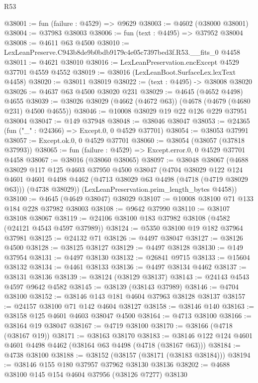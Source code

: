 \begin{lexlean}{R53}
\begin{coremodule}
@38001 := fun (failure : @4529) => @9629
@38003 := @4602 (@38000 @38001)
@38004 := @37983 @38003
@38006 := fun (text : @4495) => @37952 @38004
@38008 := @4611 @63 @4500
@38010 := LexLeanPreserve.C943b8de9b0bdb9179c4e05c7397bed3f.R53.__fits_0 @4458
@38011 := @4621 @38010
@38016 := LexLeanPreservation.encExcept @4529 @37701 @4559 @4552
@38019 := @38016 (LexLeanBoot.SurfaceLex.lexText @4458)
@38020 := @38011 @38019
@38022 := (text : @4495) -> @38008 @38020
@38026 := @4637 @63 @4500 @38020 @231
@38029 := @4645 (@4652 @4498) @4655
@38039 := @38026 @38029 (@4662 (@4672 @63)) (@4678 (@4679 (@4680 @231) @4500 @4655))
@38046 := @10008 @38029 @19 @22 @126 @229 @37951 @38004
@38047 := @149 @37948
@38048 := @38046 @38047
@38053 := @24365 (fun ("_" : @24366) => Except.{0, 0} @4529 @37701)
@38054 := @38053 @37991
@38057 := Except.ok.{0, 0} @4529 @37701
@38060 := @38054 (@38057 (@37818 @37993))
@38065 := fun (failure : @4529) => Except.error.{0, 0} @4529 @37701 @4458
@38067 := @38016 (@38060 @38065)
@38097 := @38048
    @38067
    (@4688
      @38029
      @117
      @125
      @4603
      @37950
      @4500
      @38047
      (@4704
        @38029
        @122
        @124
        @4601
        @4601
        @4498
        @4462
        (@4713 @38029 @63 @4498 (@4718 (@4719 @38029 @63)))
        (@4738 @38029))
      (LexLeanPreservation.prim_length_bytes @4458))
@38100 := @4645 (@4649 @38047) @38029
@38107 := @10008 @38100 @71 @133 @184 @228 @37982 @38003
@38108 := @9642 @37990
@38110 := @38107 @38108 @38067
@38119 := @24106 @38100 @183 @37982 @38108 (@4582 (@24121 @4543 @4597 @37989))
@38124 := @5350 @38100 @19 @182 @37964 @37981
@38125 := @24132 @71
@38126 := @4497 @38047
@38127 := @38126 @4500
@38128 := @38125 @38127
@38129 := @4497 @38128
@38130 := @149 @37954
@38131 := @4497 @38130
@38132 := @26841 @9715
@38133 := @15604 @38132
@38134 := @4461 @38133
@38136 := @4497 @38134 @4462
@38137 := @38131 @38136
@38139 := @38124 (@38129 @38137)
@38143 := @24143 @4543 @4597 @9642 @4582
@38145 := @38139 (@38143 @37989)
@38146 := @4704 @38100
@38152 := @38146 @143 @181 @4604 @37963 @38128 @38137
@38157 := @24157 @38100 @71 @142 @4604 @38127
@38158 := @38146 @140
@38163 := @38158 @125 @4601 @4603 @38047 @4500
@38164 := @4713 @38100
@38166 := @38164 @19 @38047
@38167 := @4719 @38100
@38170 := @38166 (@4718 (@38167 @19))
@38171 := @38163 @38170
@38183 := @38146 @122 @124 @4601 @4601 @4498 @4462 (@38164 @63 @4498 (@4718 (@38167 @63)))
@38184 := @4738 @38100
@38188 := @38152 (@38157 (@38171 (@38183 @38184)))
@38194 := @38146 @155 @180 @37957 @37962 @38130 @38136
@38202 := @4688 @38100 @145 @154 @4604 @37956 (@38126 @7277) @38130

\end{coremodule}
\end{lexlean}
